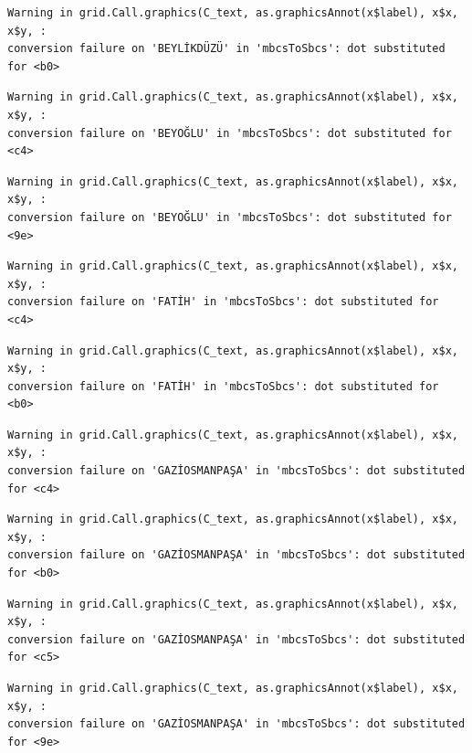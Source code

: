 \documentclass[
  11pt,
  a4paper,
  DIV=11,
  numbers=noendperiod]{scrartcl}
\begin{document}
\begin{verbatim}
Warning in grid.Call.graphics(C_text, as.graphicsAnnot(x$label), x$x, x$y, :
conversion failure on 'BEYLİKDÜZÜ' in 'mbcsToSbcs': dot substituted for <b0>
\end{verbatim}

\begin{verbatim}
Warning in grid.Call.graphics(C_text, as.graphicsAnnot(x$label), x$x, x$y, :
conversion failure on 'BEYOĞLU' in 'mbcsToSbcs': dot substituted for <c4>
\end{verbatim}

\begin{verbatim}
Warning in grid.Call.graphics(C_text, as.graphicsAnnot(x$label), x$x, x$y, :
conversion failure on 'BEYOĞLU' in 'mbcsToSbcs': dot substituted for <9e>
\end{verbatim}

\begin{verbatim}
Warning in grid.Call.graphics(C_text, as.graphicsAnnot(x$label), x$x, x$y, :
conversion failure on 'FATİH' in 'mbcsToSbcs': dot substituted for <c4>
\end{verbatim}

\begin{verbatim}
Warning in grid.Call.graphics(C_text, as.graphicsAnnot(x$label), x$x, x$y, :
conversion failure on 'FATİH' in 'mbcsToSbcs': dot substituted for <b0>
\end{verbatim}

\begin{verbatim}
Warning in grid.Call.graphics(C_text, as.graphicsAnnot(x$label), x$x, x$y, :
conversion failure on 'GAZİOSMANPAŞA' in 'mbcsToSbcs': dot substituted for <c4>
\end{verbatim}

\begin{verbatim}
Warning in grid.Call.graphics(C_text, as.graphicsAnnot(x$label), x$x, x$y, :
conversion failure on 'GAZİOSMANPAŞA' in 'mbcsToSbcs': dot substituted for <b0>
\end{verbatim}

\begin{verbatim}
Warning in grid.Call.graphics(C_text, as.graphicsAnnot(x$label), x$x, x$y, :
conversion failure on 'GAZİOSMANPAŞA' in 'mbcsToSbcs': dot substituted for <c5>
\end{verbatim}

\begin{verbatim}
Warning in grid.Call.graphics(C_text, as.graphicsAnnot(x$label), x$x, x$y, :
conversion failure on 'GAZİOSMANPAŞA' in 'mbcsToSbcs': dot substituted for <9e>
\end{verbatim}
\end{document}
